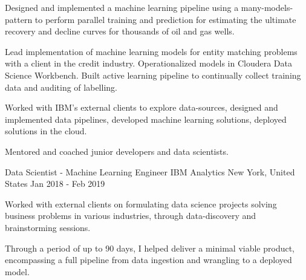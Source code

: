 \begin{cventries}
{\begin{cvitems}
        \item {Designed and implemented a machine learning pipeline using a many-models-pattern to perform parallel training and prediction for estimating the ultimate recovery and decline curves for thousands of oil and gas wells.}
        \item {Lead implementation of machine learning models for entity matching problems with a client in the credit industry. Operationalized models in Cloudera Data Science Workbench. Built active learning pipeline to continually collect training data and auditing of labelling. }
        \item {Worked with IBM's external clients to explore data-sources, designed and implemented data pipelines, developed machine learning solutions, deployed solutions in the cloud.}
        \item {Mentored and coached junior developers and data scientists.}
      \end{cvitems}
    }

  \cventry
    {Data Scientist - Machine Learning Engineer} %
    {IBM Analytics} %
    {New York, United States} %
    {Jan 2018 - Feb 2019} %
    {
      \begin{cvitems} %
        \item {Worked with external clients on formulating data science projects solving business problems in various industries, through data-discovery and brainstorming sessions.}
        \item {Through a period of up to 90 days, I helped deliver a minimal viable product, encompassing a full pipeline from data ingestion and wrangling to a deployed model.}
      \end{cvitems}
    }


\end{cventries}
